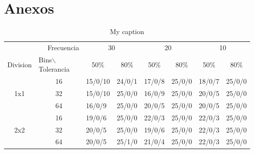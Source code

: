 \documentclass[14pt,letterpaper,hidelinks]{extarticle}
\begin{document}
\section{Anexos}
\begin{table}[]
\centering
\caption{My caption}
\label{my-label}
\begin{tabular}{|cc|l|l|l|l|l|l|}
\hline
\multicolumn{1}{|l}{} & \multicolumn{1}{r|}{Frecuencia} & \multicolumn{2}{c|}{30}                               & \multicolumn{2}{c|}{20}                               & \multicolumn{2}{c|}{10}                               \\ \cline{3-8} 
\multicolumn{1}{|l}{Division} & \multicolumn{1}{l|}{Bins$\backslash$Tolerancia} & \multicolumn{1}{c|}{50\%} & \multicolumn{1}{c|}{80\%} & \multicolumn{1}{c|}{50\%} & \multicolumn{1}{c|}{80\%} & \multicolumn{1}{c|}{50\%} & \multicolumn{1}{c|}{80\%} \\ \hline
\multicolumn{1}{|c|}{\multirow{3}{*}{1x1}} & 16                                   & 15/0/10                   & 24/0/1                    & 17/0/8                    & 25/0/0                    & 18/0/7                    & 25/0/0                    \\ \cline{2-8} 
\multicolumn{1}{|c|}{}                     & 32                                   & 15/0/10                   & 25/0/0                    & 16/0/9                    & 25/0/0                    & 20/0/5                    & 25/0/0                    \\ \cline{2-8} 
\multicolumn{1}{|c|}{}                     & 64                                   & 16/0/9                    & 25/0/0                    & 20/0/5                    & 25/0/0                    & 20/0/5                    & 25/0/0                    \\ \hline
\multicolumn{1}{|c|}{\multirow{3}{*}{2x2}} & 16                                   & 19/0/6                    & 25/0/0                    & 22/0/3                    & 25/0/0                    & 22/0/3                    & 25/0/0                    \\ \cline{2-8} 
\multicolumn{1}{|c|}{}                     & 32                                   & 20/0/5                    & 25/0/0                    & 19/0/6                    & 25/0/0                    & 22/0/3                    & 25/0/0                    \\ \cline{2-8} 
\multicolumn{1}{|c|}{}                     & 64                                   & 20/0/5                    & 25/1/0                    & 21/0/4                    & 25/0/0                    & 22/0/3                    & 25/0/0                    \\ \hline

\end{tabular}
\end{table}
\end{document}
